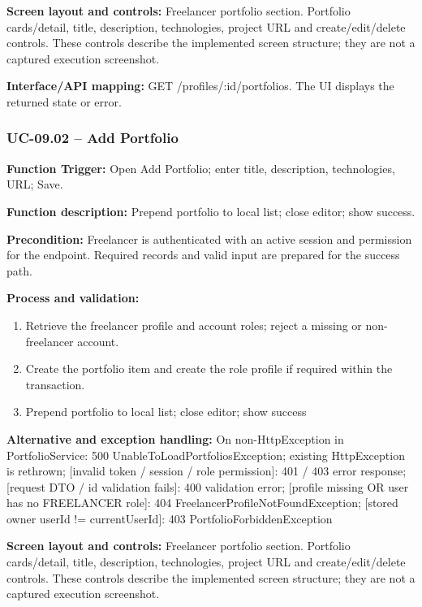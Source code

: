 \textbf{Screen layout and controls:} Freelancer portfolio section. Portfolio cards/\allowbreak{}detail, title, description, technologies, project URL and create/\allowbreak{}edit/\allowbreak{}delete controls. These controls describe the implemented screen structure; they are not a captured execution screenshot.

\textbf{Interface/\allowbreak{}API mapping:} GET /\allowbreak{}profiles/\allowbreak{}:id/\allowbreak{}portfolios. The UI displays the returned state or error.

\subsubsection{UC-09.02 -- Add Portfolio}
\textbf{Function Trigger:} Open Add Portfolio; enter title, description, technologies, URL; Save.

\textbf{Function description:} Prepend portfolio to local list; close editor; show success.

\textbf{Precondition:} Freelancer is authenticated with an active session and permission for the endpoint. Required records and valid input are prepared for the success path.

\textbf{Process and validation:}
\begin{enumerate}
\item Retrieve the freelancer profile and account roles; reject a missing or non-freelancer account.
\item Create the portfolio item and create the role profile if required within the transaction.
\item Prepend portfolio to local list; close editor; show success
\end{enumerate}
\textbf{Alternative and exception handling:} On non-Http\allowbreak{}Exception in Portfolio\allowbreak{}Service: 500 Unable\allowbreak{}To\allowbreak{}Load\allowbreak{}Portfolios\allowbreak{}Exception; existing Http\allowbreak{}Exception is rethrown; [invalid token /\allowbreak{} session /\allowbreak{} role permission]: 401 /\allowbreak{} 403 error response; [request DTO /\allowbreak{} id validation fails]: 400 validation error; [profile missing OR user has no FREELANCER role]: 404 Freelancer\allowbreak{}Profile\allowbreak{}Not\allowbreak{}Found\allowbreak{}Exception; [stored owner user\allowbreak{}Id !=\allowbreak{} current\allowbreak{}User\allowbreak{}Id]: 403 Portfolio\allowbreak{}Forbidden\allowbreak{}Exception

\textbf{Screen layout and controls:} Freelancer portfolio section. Portfolio cards/\allowbreak{}detail, title, description, technologies, project URL and create/\allowbreak{}edit/\allowbreak{}delete controls. These controls describe the implemented screen structure; they are not a captured execution screenshot.

